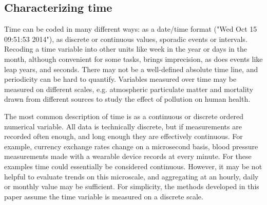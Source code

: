 \documentclass[12pt]{article}
\begin{document}


\subsection{Characterizing time}

Time can be coded in many different ways: as a date/time format ("Wed Oct 15 09:51:53 2014"), as discrete or continuous values, sporadic events or intervals. Recoding a time variable into other units like week in the year or days in the month, although convenient for some tasks, brings imprecision, as does events like leap years, and seconds. There may not be a well-defined absolute time line, and periodicity can be hard to quantify. Variables measured over time may be measured on different scales, e.g. atmospheric particulate matter and mortality drawn from different sources to study the effect of pollution on human health. 


The most common description of time is as a continuous or discrete ordered numerical variable. All data is technically discrete, but if measurements are recorded often enough, and long enough they are effectively continuous. For example, currency exchange rates change on a microsecond basis, blood pressure measurements made with a wearable device records at every minute. For these examples time could essentially be considered continuous. However, it may be not helpful to evaluate trends on this microscale, and aggregating at an hourly, daily or monthly value may be sufficient. For simplicity, the methods developed in this paper assume the time variable is measured on a discrete scale.

\end{document}
